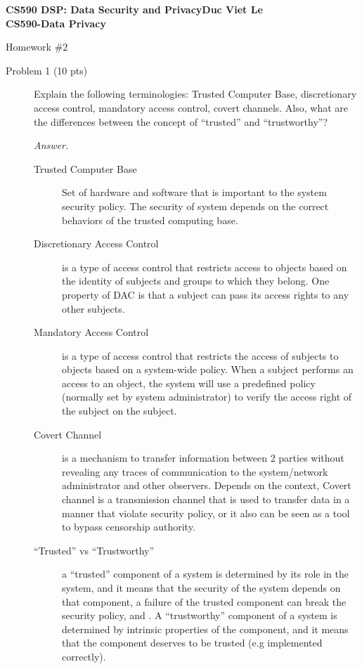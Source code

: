 \documentclass[11pt]{article}
\begin{document}
\thispagestyle{empty}

\noindent \textbf{CS590 DSP: Data Security and Privacy\hspace*{\fill}Duc Viet Le}
\\
\noindent \textbf{\hspace*{\fill}CS590-Data Privacy}

\begin{center}
{\LARGE Homework \#2}
\end{center}


\begin{description}
 \item[Problem 1 (10 pts)] Explain the following terminologies: Trusted Computer Base, discretionary access control, mandatory access control, covert channels.  Also, what are the differences between the concept of ``trusted'' and ``trustworthy''?\\

\begin{mdframed}
\textit{Answer. }
\begin{description}
	\item[Trusted Computer Base] Set of hardware and software that is important to the system security policy. The security of system depends on the correct behaviors of the trusted computing base. 
	\item[Discretionary Access Control] is a type of access control that restricts access to objects based on the identity of subjects and groups to which they belong. One property of DAC is that a subject can pass its access rights to any other subjects. 
	\item[Mandatory Access Control] is a type of access control that restricts the access of subjects to objects based on a system-wide policy. When a subject performs an access to an object, the system will use a predefined policy (normally set by system administrator) to verify the access right of the subject on the subject. 
	\item[Covert Channel] is a mechanism to transfer information between 2 parties without revealing any traces of communication to the system/network administrator and other observers. Depends on the context, Covert channel is a transmission channel that is used to transfer data in a manner that violate security policy, or it also can be seen as a tool to bypass censorship authority. 
	\item[``Trusted'' vs ``Trustworthy''] a ``trusted'' component of a system is determined by its role in the system, and it means that the security of the system depends on that component, a failure of the trusted component can break the security policy, and . A ``trustworthy'' component of a system is determined by intrinsic properties of the component, and it means that the component deserves to be trusted (e.g implemented correctly).
\end{description}
\end{mdframed}


\end{description}
\end{document}
